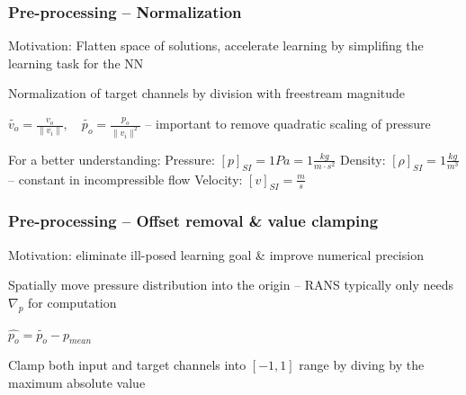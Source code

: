 \begin{frame}
    \frametitle{Pre-processing -- Normalization}
\vspace*{0.8cm}

Motivation: Flatten space of solutions, accelerate learning by simplifing the learning task for the NN

Normalization of target channels by division with freestream magnitude 

$\tilde{v_{o}} = \frac{v_{o}}{\|v_{i}\|}, \quad \tilde{p_{o}} = \frac{p_{o}}{\|v_{i}\|^{2}}$ -- important to remove quadratic scaling of pressure

For a better understanding: \newline
Pressure: $[p]_{SI} = 1 Pa = 1 \frac{kg}{m \cdot s^2}$ \newline
Density: $[\rho]_{SI} = 1 \frac{kg}{m^3}$ -- constant in incompressible flow \newline
Velocity: $[v]_{SI} = \frac{m}{s}$ \newline

\end{frame}
\clearpage

\begin{frame}
    \frametitle{Pre-processing -- Offset removal \& value clamping}
\vspace*{0.8cm}
Motivation: eliminate ill-posed learning goal \& improve numerical precision

Spatially move pressure distribution into the origin -- RANS typically only needs $\nabla_{p}$ for computation

$\hat{p_o} = \tilde{p_o} - p_{mean}$    

Clamp both input and target channels into $[-1, 1]$ range by diving by the maximum absolute value

\end{frame}
\clearpage

